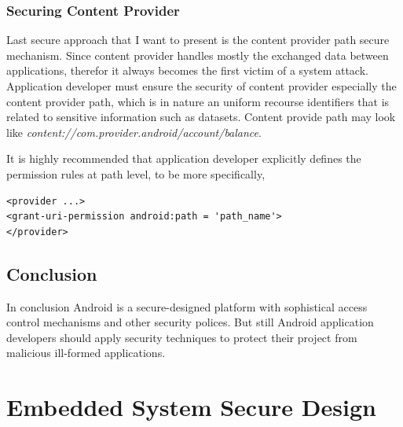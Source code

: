 \subsubsection{Securing Content Provider}
Last secure approach that I want to present is the content provider path  secure mechanism. Since content provider handles mostly the exchanged data between applications, therefor it always becomes the first victim of a system attack. Application developer must ensure the security of content provider especially the content  provider path, which is in nature an uniform recourse identifiers that is related  to sensitive information such as datasets\cite{android_secure_cook}. Content provide path may look like \emph{content://com.provider.android/account/balance}.

It is highly recommended that application developer explicitly defines the permission rules at path level, to be more specifically\cite{android_secure_cook}, 
\begin{verbatim}
<provider ...>
<grant-uri-permission android:path = 'path_name'>
</provider>
\end{verbatim} 
\subsection{Conclusion}
In conclusion Android is  a secure-designed platform with sophistical access control mechanisms and other security polices. But still Android  application developers should apply security techniques to protect their project from malicious ill-formed applications.
\section{Embedded System Secure Design}